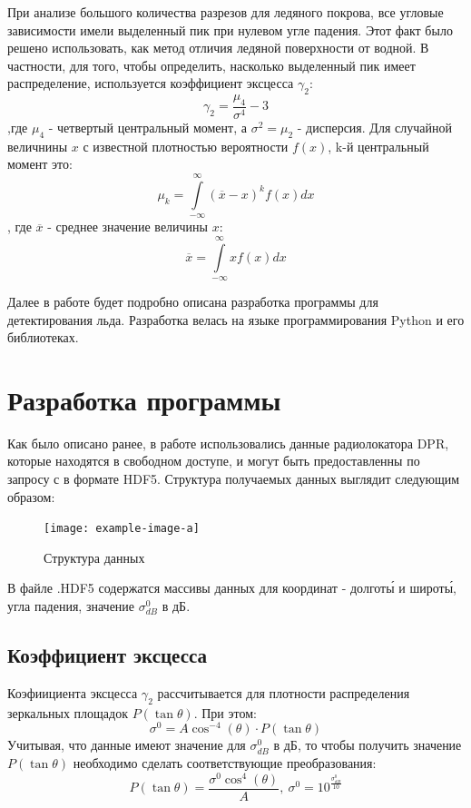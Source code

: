 При анализе большого количества разрезов для ледяного покрова, все  угловые зависимости имели выделенный пик при нулевом
угле падения. Этот факт было решено использовать, как метод отличия ледяной поверхности от водной. В частности, для
того, чтобы определить, насколько выделенный пик имеет распределение, используется коэффициент эксцесса $\gamma_2$:
\begin{equation}
  \gamma_2 = \frac{\mu_4}{\sigma^4} -3
  \label{eq:5}
\end{equation}
,где $\mu_4$ - четвертый центральный момент, а $\sigma^2 = \mu_2$ - дисперсия. Для случайной величнины $x$ с известной плотностью вероятности $f(x)$, k-й
центральный момент это:
\begin{equation}
  \mu_k = \int \limits_{-\infty}^{\infty}(\overline{x}-x)^k f(x) dx
  \label{eq:6}
\end{equation} 
, где $\overline{x}$ - среднее значение величины $x$:
\begin{equation}
  \overline{x} = \int \limits_{-\infty}^{\infty}x f(x) dx
  \label{eq:7}
\end{equation}

Далее в работе будет подробно описана разработка программы для детектирования льда. Разработка
велась на языке программирования Python и его библиотеках.

\section{Разработка программы}

Как было описано ранее, в работе использовались данные радиолокатора DPR, которые находятся в свободном доступе, и могут
быть предоставленны по запросу с \cite{data} в формате HDF5. Структура получаемых данных выглядит следующим образом:
\begin{figure}[h!]
  \centering
  \texttt{[image: example-image-a]}
  \caption{Структура данных}
  \label{fig:5}
\end{figure}

В файле .HDF5 содержатся массивы данных для координат - долгот\'{ы} и широт\'{ы}, угла падения, значение $\sigma^0_{dB}$ в
дБ. 


\subsection{Коэффициент эксцесса}

Коэфиициента эксцесса $\gamma_2$ рассчитывается для плотности распределения зеркальных площадок $P(\tan \theta)$. При этом: 
\begin{equation}
  \sigma^0 = A \cos^{-4}(\theta) \cdot P(\tan \theta)
  \label{eq:8}
\end{equation}
Учитывая, что данные имеют значение для $\sigma^0_{dB}$ в дБ, то чтобы получить значение $P(\tan \theta)$ необходимо сделать
соответствующие преобразования:
\begin{equation}
  P(\tan \theta) =  \frac{\sigma^0 \cos^4(\theta)}{A},~ \sigma^0 = 10^{\frac{\sigma^0_{dB}}{10}}
  \label{eq:9}
\end{equation}

